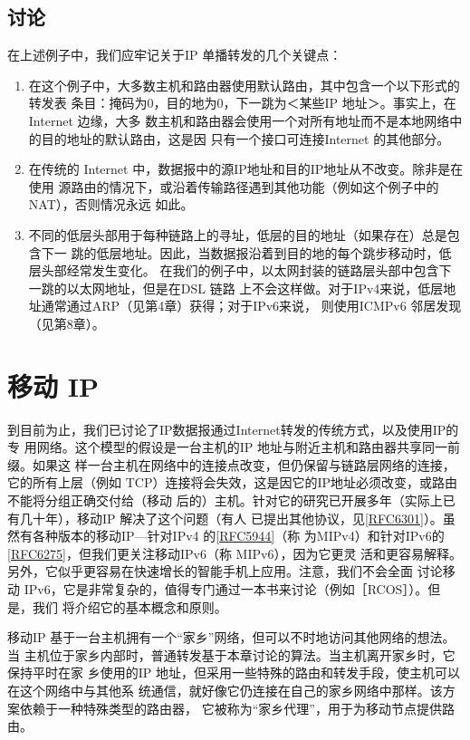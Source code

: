 \subsection{讨论}
在上述例子中，我们应牢记关于IP 单播转发的几个关键点：

\begin{enumerate}
    \item 在这个例子中，大多数主机和路由器使用默认路由，其中包含一个以下形式的转发表
    条目：掩码为0，目的地为0，下一跳为＜某些IP 地址＞。事实上，在 Internet 边缘，大多
    数主机和路由器会使用一个对所有地址而不是本地网络中的目的地址的默认路由，这是因
    只有一个接口可连接Internet 的其他部分。
    
    \item 在传统的 Internet 中，数据报中的源IP地址和目的IP地址从不改变。除非是在使用
    源路由的情况下，或沿着传输路径遇到其他功能（例如这个例子中的NAT），否则情况永远
    如此。
    
    \item 不同的低层头部用于每种链路上的寻址，低层的目的地址（如果存在）总是包含下一
    跳的低层地址。因此，当数据报沿着到目的地的每个跳步移动时，低层头部经常发生变化。
    在我们的例子中，以太网封装的链路层头部中包含下一跳的以太网地址，但是在DSL 链路
    上不会这样做。对于IPv4来说，低层地址通常通过ARP（见第4章）获得；对于IPv6来说，
    则使用ICMPv6 邻居发现（见第8章）。
\end{enumerate}

\section{移动 IP}
到目前为止，我们已讨论了IP数据报通过Internet转发的传统方式，以及使用IP的专
用网络。这个模型的假设是一台主机的IP 地址与附近主机和路由器共享同一前缀。如果这
样一台主机在网络中的连接点改变，但仍保留与链路层网络的连接，它的所有上层（例如
TCP）连接将会失效，这是因它的IP地址必须改变，或路由不能将分组正确交付给（移动
后的）主机。针对它的研究已开展多年（实际上已有几十年），移动IP 解决了这个问题（有人
已提出其他协议，见\href{https://www.rfc-editor.org/rfc/rfc6301}{[RFC6301]}）。虽然有各种版本的移动IP—针对IPv4 的\href{https://www.rfc-editor.org/rfc/rfc5944}{[RFC5944]}（称
为MIPv4）和针对IPv6的\href{https://www.rfc-editor.org/rfc/rfc6275}{[RFC6275]}，但我们更关注移动IPv6（称 MIPv6），因为它更灵
活和更容易解释。另外，它似乎更容易在快速增长的智能手机上应用。注意，我们不会全面
讨论移动 IPv6，它是非常复杂的，值得专门通过一本书来讨论（例如［RCOS］）。但是，我们
将介绍它的基本概念和原则。

移动IP 基于一台主机拥有一个“家乡”网络，但可以不时地访问其他网络的想法。当
主机位于家乡内部时，普通转发基于本章讨论的算法。当主机离开家乡时，它保持平时在家
乡使用的IP 地址，但采用一些特殊的路由和转发手段，使主机可以在这个网络中与其他系
统通信，就好像它仍连接在自己的家乡网络中那样。该方案依赖于一种特殊类型的路由器，
它被称为“家乡代理”，用于为移动节点提供路由。

